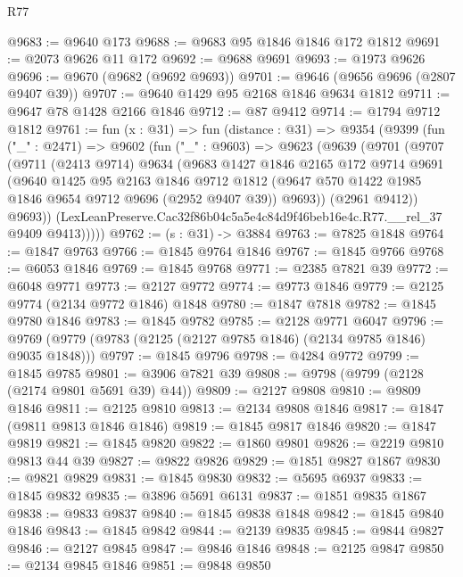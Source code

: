 \begin{lexlean}{R77}
\begin{coremodule}
@9683 := @9640 @173
@9688 := @9683 @95 @1846 @1846 @172 @1812
@9691 := @2073 @9626 @11 @172
@9692 := @9688 @9691
@9693 := @1973 @9626
@9696 := @9670 (@9682 (@9692 @9693))
@9701 := @9646 (@9656 @9696 (@2807 @9407 @39))
@9707 := @9640 @1429 @95 @2168 @1846 @9634 @1812
@9711 := @9647 @78 @1428 @2166 @1846
@9712 := @87 @9412
@9714 := @1794 @9712 @1812
@9761 := fun (x : @31) =>
  fun (distance : @31) =>
  @9354
    (@9399
      (fun ("_" : @2471) =>
      @9602
        (fun ("_" : @9603) =>
        @9623
          (@9639
            (@9701
              (@9707
                (@9711
                  (@2413 @9714)
                  @9634
                  (@9683
                    @1427
                    @1846
                    @2165
                    @172
                    @9714
                    @9691
                    (@9640
                      @1425
                      @95
                      @2163
                      @1846
                      @9712
                      @1812
                      (@9647 @570 @1422 @1985 @1846 @9654 @9712 @9696 (@2952 @9407 @39))
                      @9693))
                  (@2961 @9412))
                @9693))
            (LexLeanPreserve.Cac32f86b04c5a5e4c84d9f46beb16e4c.R77.__rel_37 @9409 @9413)))))
@9762 := (s : @31) -> @3884
@9763 := @7825 @1848
@9764 := @1847 @9763
@9766 := @1845 @9764 @1846
@9767 := @1845 @9766
@9768 := @6053 @1846
@9769 := @1845 @9768
@9771 := @2385 @7821 @39
@9772 := @6048 @9771
@9773 := @2127 @9772
@9774 := @9773 @1846
@9779 := @2125 @9774 (@2134 @9772 @1846) @1848
@9780 := @1847 @7818
@9782 := @1845 @9780 @1846
@9783 := @1845 @9782
@9785 := @2128 @9771 @6047
@9796 := @9769 (@9779 (@9783 (@2125 (@2127 @9785 @1846) (@2134 @9785 @1846) @9035 @1848)))
@9797 := @1845 @9796
@9798 := @4284 @9772
@9799 := @1845 @9785
@9801 := @3906 @7821 @39
@9808 := @9798 (@9799 (@2128 (@2174 @9801 @5691 @39) @44))
@9809 := @2127 @9808
@9810 := @9809 @1846
@9811 := @2125 @9810
@9813 := @2134 @9808 @1846
@9817 := @1847 (@9811 @9813 @1846 @1846)
@9819 := @1845 @9817 @1846
@9820 := @1847 @9819
@9821 := @1845 @9820
@9822 := @1860 @9801
@9826 := @2219 @9810 @9813 @44 @39
@9827 := @9822 @9826
@9829 := @1851 @9827 @1867
@9830 := @9821 @9829
@9831 := @1845 @9830
@9832 := @5695 @6937
@9833 := @1845 @9832
@9835 := @3896 @5691 @6131
@9837 := @1851 @9835 @1867
@9838 := @9833 @9837
@9840 := @1845 @9838 @1848
@9842 := @1845 @9840 @1846
@9843 := @1845 @9842
@9844 := @2139 @9835
@9845 := @9844 @9827
@9846 := @2127 @9845
@9847 := @9846 @1846
@9848 := @2125 @9847
@9850 := @2134 @9845 @1846
@9851 := @9848 @9850

\end{coremodule}
\end{lexlean}
